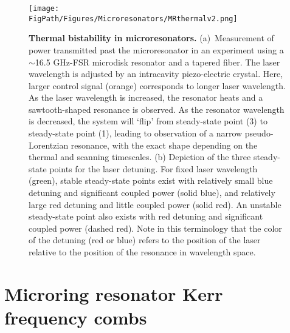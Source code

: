 \begin{figure}[htpb]
	\begin{center}
		\texttt{[image: \\FigPath/Figures/Microresonators/MRthermalv2.png]}
	\end{center}
	\caption[Thermal bistability in microresonators]{\textbf{Thermal bistability in microresonators.} (a)~Measurement of power transmitted past the microresonator in an experiment using a $\sim$16.5 GHz-FSR microdisk resonator and a tapered fiber. The laser wavelength is adjusted by an intracavity piezo-electric crystal. Here, larger control signal (orange) corresponds to longer laser wavelength. As the laser wavelength is increased, the resonator heats and a sawtooth-shaped resonance is observed. As the resonator wavelength is decreased, the system will `flip' from steady-state point (3) to steady-state point (1), leading to observation of a narrow pseudo-Lorentzian resonance, with the exact shape depending on the thermal and scanning timescales. (b) Depiction of the three steady-state points for the laser detuning. For fixed laser wavelength (green), stable steady-state points exist with relatively small blue detuning and significant coupled power (solid blue), and relatively large red detuning and little coupled power (solid red). An unstable steady-state point also exists with red detuning and significant coupled power (dashed red). Note in this terminology that the color of the detuning (red or blue) refers to the position of the laser relative to the position of the resonance in wavelength space. }
	
	\label{fig:MRthermal}
\end{figure} 








\section{Microring resonator Kerr frequency combs}

